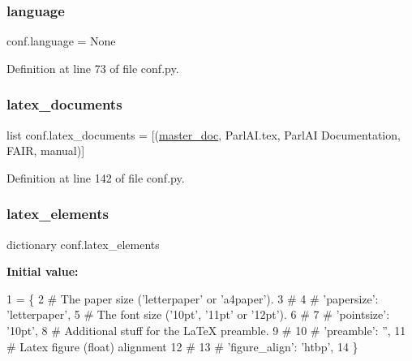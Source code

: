 \subsubsection{\texorpdfstring{language}{language}}
{\footnotesize\ttfamily conf.\+language = None}



Definition at line 73 of file conf.\+py.

\mbox{\label{namespaceconf_a7812f49970f3de0d15dd7b9b9a10e3a1}} 
\subsubsection{\texorpdfstring{latex\+\_\+documents}{latex\_documents}}
{\footnotesize\ttfamily list conf.\+latex\+\_\+documents = \mbox{[}(\hyperlink{namespaceconf_a6fcd7e5236f355b1e1a55f9d95988810}{master\+\_\+doc}, \textquotesingle{}Parl\+A\+I.\+tex\textquotesingle{}, \textquotesingle{}Parl\+AI Documentation\textquotesingle{}, \textquotesingle{}F\+A\+IR\textquotesingle{}, \textquotesingle{}manual\textquotesingle{})\mbox{]}}



Definition at line 142 of file conf.\+py.

\mbox{\label{namespaceconf_a33619d385ad23765ac6ebb58bf82d43d}} 
\subsubsection{\texorpdfstring{latex\+\_\+elements}{latex\_elements}}
{\footnotesize\ttfamily dictionary conf.\+latex\+\_\+elements}

{\bfseries Initial value\+:}
\begin{DoxyCode}
1 =  \{
2     \textcolor{comment}{# The paper size ('letterpaper' or 'a4paper').}
3     \textcolor{comment}{#}
4     \textcolor{comment}{# 'papersize': 'letterpaper',}
5     \textcolor{comment}{# The font size ('10pt', '11pt' or '12pt').}
6     \textcolor{comment}{#}
7     \textcolor{comment}{# 'pointsize': '10pt',}
8     \textcolor{comment}{# Additional stuff for the LaTeX preamble.}
9     \textcolor{comment}{#}
10     \textcolor{comment}{# 'preamble': '',}
11     \textcolor{comment}{# Latex figure (float) alignment}
12     \textcolor{comment}{#}
13     \textcolor{comment}{# 'figure\_align': 'htbp',}
14 \}
\end{DoxyCode}


